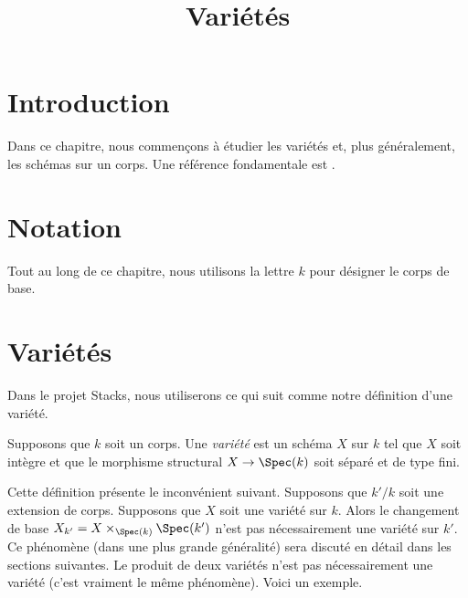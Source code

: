 

%


\title{Variétés}


\maketitle

\label{section-phantom}

\tableofcontents

\section{Introduction}
\label{section-introduction}

\noindent
Dans ce chapitre, nous commençons à étudier les variétés et, plus
généralement, les schémas sur un corps. Une référence fondamentale est \cite{EGA}.








\section{Notation}
\label{section-notation}

\noindent
Tout au long de ce chapitre, nous utilisons la lettre $k$ pour désigner le corps de base.










\section{Variétés}
\label{section-varieties}

\noindent
Dans le projet Stacks, nous utiliserons ce
qui suit comme notre définition d'une variété.

\begin{definition}
\label{definition-variety}
Supposons que $k$ soit un corps. Une {\it variété } est un
schéma $X$ sur $k$ tel que $X$ soit intègre et que le
morphisme structural $X \to \Spec(k)$ soit séparé et de type fini.
\end{definition}

\noindent
Cette définition présente le inconvénient suivant.
Supposons que $k'/k$ soit une extension de corps. Supposons
que $X$ soit une variété sur $k$. Alors le changement de base
$X_{k'} = X \times_{\Spec(k)} \Spec(k')$ n'est pas
nécessairement une variété sur $k'$. Ce phénomène (dans une
plus grande généralité) sera discuté en détail dans les sections
suivantes. Le produit de deux variétés n'est pas nécessairement
une variété (c'est vraiment le même phénomène). Voici un exemple.

